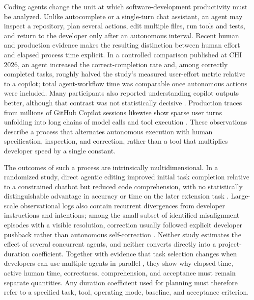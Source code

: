 Coding agents change the unit at which software-development productivity must
be analyzed. Unlike autocomplete or a single-turn chat assistant, an agent may
inspect a repository, plan several actions, edit multiple files, run tools and
tests, and return to the developer only after an autonomous interval. Recent
human and production evidence makes the resulting distinction between human
effort and elapsed process time explicit. In a controlled comparison published
at CHI 2026, an agent increased the correct-completion rate and, among correctly
completed tasks, roughly halved the study's measured user-effort metric relative
to a copilot; total agent-workflow time was comparable once autonomous actions
were included. Many participants also reported understanding copilot outputs
better, although that contrast was not statistically decisive
\cite{chen2026codewithme}. Production traces from
millions of GitHub Copilot sessions likewise show sparse user turns unfolding
into long chains of model calls and tool execution \cite{liu2026agenticcoding}.
These observations describe a process that alternates autonomous execution with
human specification, inspection, and correction, rather than a tool that
multiplies developer speed by a single constant.

The outcomes of such a process are intrinsically multidimensional. In a
randomized study, direct agentic editing improved initial task completion
relative to a constrained chatbot but reduced code comprehension, with no
statistically distinguishable advantage in accuracy or time on the later
extension task \cite{balepur2026impaired}.
Large-scale observational logs also contain recurrent divergences from
developer instructions and intentions; among the small subset of identified
misalignment episodes with a visible resolution, correction usually followed
explicit developer pushback rather than autonomous self-correction
\cite{tang2026misalignment}. Neither study estimates the effect of several
concurrent agents, and neither converts directly into a project-duration
coefficient. Together with evidence that task selection changes when developers
can use multiple agents in parallel \cite{metr2026uplift}, they show why elapsed
time, active human time, correctness, comprehension, and acceptance must remain
separate quantities. Any duration coefficient used for planning must therefore
refer to a specified task, tool, operating mode, baseline, and acceptance
criterion.

